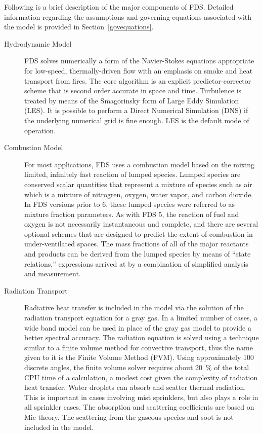 \documentclass[11pt]{book}
\begin{document}
Following is a brief description of the major components of FDS. Detailed information regarding the assumptions and governing equations associated
with the model is provided in Section~\ref{govequations}.
\begin{description}
\item[Hydrodynamic Model] FDS
solves numerically a form of the Navier-Stokes equations appropriate for low-speed, thermally-driven flow with an emphasis on smoke and heat
transport from fires. The core algorithm is an explicit predictor-corrector scheme that is second order accurate in space and time. Turbulence is
treated by means of the Smagorinsky form of Large Eddy Simulation (LES). It is possible to perform a Direct Numerical Simulation (DNS) if the
underlying numerical grid is fine enough. LES is the default mode of operation.
\item[Combustion Model]
For most applications, FDS uses a combustion model based on the mixing limited, infinitely fast reaction of lumped species. Lumped species are
conserved scalar quantities that represent a mixture of species such as air which is a mixture of nitrogren, oxygen, water vapor, and carbon dioxide.
In FDS versions prior to 6, these lumped species were referred to as mixture fraction parameters.  As with FDS 5, the reaction of fuel and oxygen is
not necessarily instantaneous and complete, and there are several optional schemes that are designed to predict the extent of combustion in
under-ventilated spaces. The mass fractions of all of the major reactants and products can be derived from the lumped species by means of ``state
relations,'' expressions arrived at by a combination of simplified analysis and measurement.
\item[Radiation Transport] Radiative heat transfer is included in the
model via the solution of the radiation transport equation for a gray gas. In a limited number of cases, a wide band model can be used in place of
the gray gas model to provide a better spectral accuracy. The radiation equation is solved using a technique similar to a finite volume method for
convective transport, thus the name given to it is the Finite Volume Method (FVM). Using approximately 100 discrete angles, the finite volume solver
requires about 20~\% of the total CPU time of a calculation, a modest cost given the complexity of radiation heat transfer.  Water droplets can
absorb and scatter thermal radiation. This is important in cases involving mist sprinklers, but also plays a role in all sprinkler cases. The
absorption and scattering coefficients are based on Mie theory. The scattering from the gaseous species and soot is not included in the model.

\end{description}
\end{document}
